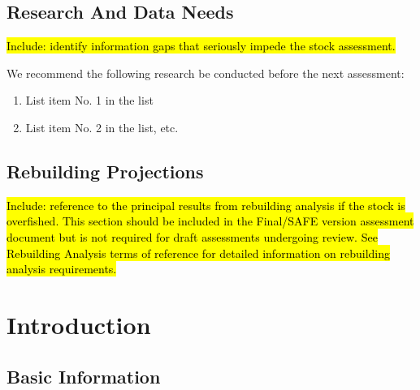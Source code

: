 \documentclass[12pt,]{article}
\begin{document}
\FloatBarrier

\newpage

\subsection*{Research And Data Needs}\label{research-and-data-needs}

\hl{Include: identify information gaps that seriously impede the stock assessment.}

We recommend the following research be conducted before the next
assessment:

\begin{enumerate}

\item List item No. 1 in the list

\item List item No. 2 in the list, etc.

\end{enumerate}

\subsection*{Rebuilding Projections}\label{rebuilding-projections}

\hl{Include: reference to the principal results from rebuilding analysis if the 
stock is overfished. This section should be included in the Final/SAFE version 
assessment document but is not required for draft assessments undergoing review. 
See Rebuilding Analysis terms of reference for detailed information on 
rebuilding analysis requirements.}

\FloatBarrier

\newpage

\renewcommand{\thefigure}{\arabic{figure}}
\renewcommand{\thetable}{\arabic{table}}

\setcounter{figure}{0} \setcounter{table}{0}

\section{Introduction}\label{introduction}

\subsection{Basic Information}\label{basic-information}
\end{document}
